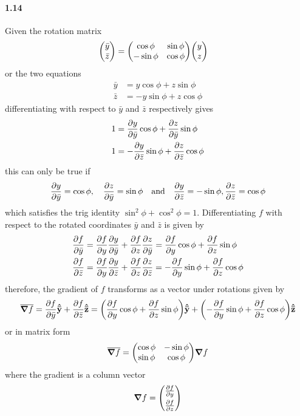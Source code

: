 \documentclass[../main.tex]{subfiles}
\begin{document}
\paragraph{1.14}
Given the rotation matrix
\begin{align*}
    \mqty(\bar{y} \\ \bar{z}) &= \mqty(\cos\phi & \sin\phi \\ -\sin\phi & \cos\phi)
    \mqty(y \\ z)
\end{align*}
or the two equations
\begin{align*}
    \bar{y} &= y \cos\phi + z \sin\phi \\
    \bar{z} &= -y \sin\phi + z \cos\phi
\end{align*}
differentiating with respect to $\bar{y}$ and $\bar{z}$ respectively gives
\begin{align*}
    1 &= \pdv{y}{\bar{y}}\cos\phi + \pdv{z}{\bar{y}}\sin\phi \\
    1 &= -\pdv{y}{\bar{z}}\sin\phi + \pdv{z}{\bar{z}}\cos\phi
\end{align*}
this can only be true if
\begin{align*}
    \pdv{y}{\bar{y}} = \cos\phi     ,\quad      \pdv{z}{\bar{y}} = \sin\phi
    \qand \pdv{y}{\bar{z}} = -\sin\phi      ,       \pdv{z}{\bar{z}} = \cos\phi
\end{align*}
which satisfies the trig identity $\sin^2\phi + \cos^2\phi = 1$. Differentiating $f$ with respect to
the rotated coordinates $\bar{y}$ and $\bar{z}$ is given by
\begin{align*}
    \pdv{f}{\bar{y}} &= \pdv{f}{y} \pdv{y}{\bar{y}} + \pdv{f}{z} \pdv{z}{\bar{y}}
    = \pdv{f}{y} \cos\phi + \pdv{f}{z} \sin\phi \\
    \pdv{f}{\bar{z}} &= \pdv{f}{y} \pdv{y}{\bar{z}} + \pdv{f}{z} \pdv{z}{\bar{z}}
    = -\pdv{f}{y} \sin\phi + \pdv{f}{z} \cos\phi
\end{align*}
therefore, the gradient of $f$ transforms as a vector under rotations given by
\begin{align*}
    \overline{\grad{f}} = \pdv{f}{\bar{y}} \vu{\bar{y}} + \pdv{f}{\bar{z}} \vu{\bar{z}}
    = \quantity(\pdv{f}{y} \cos\phi + \pdv{f}{z} \sin\phi) \vu{\bar{y}}
    + \quantity(-\pdv{f}{y} \sin\phi + \pdv{f}{z} \cos\phi) \vu{\bar{z}}
\end{align*}
or in matrix form
\begin{align*}
    \overline{\grad{f}} = \mqty(\cos\phi & -\sin\phi \\ \sin\phi & \cos\phi) \grad{f}
\end{align*}
where the gradient is a column vector
\begin{align*}
    \grad{f} = \begin{pmatrix}
        \pdv{f}{y} \\[1ex] \pdv{f}{z}
    \end{pmatrix}
\end{align*}
\end{document}
